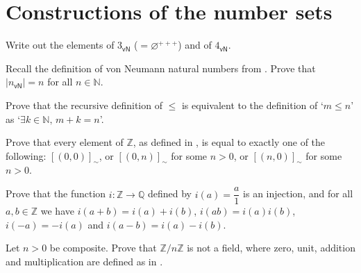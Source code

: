 \section{Constructions of the number sets}


\begin{exercise}
Write out the elements of $3_{\mathsf{vN}}$ ($=\varnothing^{+++}$) and of $4_{\mathsf{vN}}$.
\end{exercise}

\begin{exercise}
\label{exSizeOfVonNeumannOrdinals}
Recall the definition of von Neumann natural numbers from . Prove that $|n_{\mathsf{vN}}| = n$ for all $n \in \mathbb{N}$.
\end{exercise}


\begin{exercise}
Prove that the recursive definition of $\le$ is equivalent to the definition of `$m \le n$' as `$\exists k \in \mathbb{N},\, m+k=n$'.
\end{exercise}


\begin{exercise}
\label{exRepresentativesOfElementsOfZ}
Prove that every element of $\mathbb{Z}$, as defined in , is equal to exactly one of the following: $[(0,0)]_{\sim}$, or $[(0,n)]_{\sim}$ for some $n>0$, or $[(n,0)]_{\sim}$ for some $n>0$.
\end{exercise}



\begin{exercise}
Prove that the function $i : \mathbb{Z} \to \mathbb{Q}$ defined by $i(a) = \dfrac{a}{1}$ is an injection, and for all $a,b \in \mathbb{Z}$ we have $i(a+b) = i(a)+i(b)$, $i(ab) = i(a)i(b)$, $i(-a) = -i(a)$ and $i(a-b) = i(a)-i(b)$.
\end{exercise}



\begin{exercise}
Let $n > 0$ be composite. Prove that $\mathbb{Z}/n\mathbb{Z}$ is not a field, where zero, unit, addition and multiplication are defined as in .
\end{exercise}




